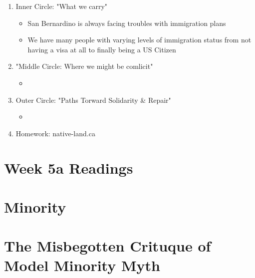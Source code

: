 \documentclass{article}
\begin{document}
  \begin{enumerate}
    \item Inner Circle: "What we carry"
      \begin{itemize}
        \item San Bernardino is always facing troubles with immigration plans
          \item We have many people with varying levels of immigration status from not having a
          visa at all to finally being a US Citizen

      \end{itemize}

    \item "Middle Circle: Where we might be comlicit"
      \begin{itemize}
        \item
      \end{itemize}

    \item Outer Circle: "Paths Torward Solidarity \& Repair"
      \begin{itemize}
        \item
      \end{itemize}
    \item Homework: native-land.ca
  \end{enumerate}

  \section*{Week 5a Readings}
  \section{Minority}
  \section{The Misbegotten Crituque of Model Minority Myth}
\end{document}
